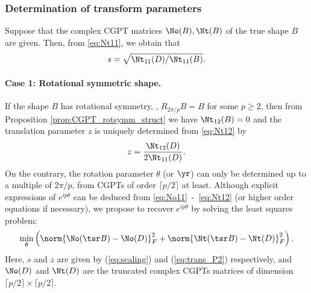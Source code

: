 \subsubsection{Determination of transform
  parameters}\label{sec:determ-transf-param}
Suppose that the complex CGPT matrices $\No(B), \Nt(B)$ of the
true shape $B$ are given. Then, from \eqref{eq:Nt11}, we obtain
that
\begin{align}
  s = \sqrt{\Nt_{11}(D) / \Nt_{11}(B)}. \label{eq:scaling}
\end{align}

\paragraph{Case 1: Rotational symmetric shape.}
If the shape $B$ has rotational symmetry, \ie, $R_{2\pi /p}B =B$
for some $p\geq 2$, then from Proposition
\ref{prop:CGPT_rotsymm_struct} we have $\Nt_{12}(B)=0$ and the
translation parameter $z$ is uniquely determined from
\eqref{eq:Nt12} by
\begin{align}
  z = \frac{\Nt_{12}(D)}{2\Nt_{11}(D)}. \label{eq:trans_P2}
\end{align}
On the contrary, the rotation parameter $\theta$ (or $\yr$) can
only be determined up to a multiple of ${2\pi/p}$, from CGPTs of
order $\lceil p/2 \rceil$ at least. Although explicit expressions
of $e^{ip\theta}$ can be deduced from
\eqref{eq:No11}~-~\eqref{eq:Nt12} (or higher order equations if
necessary), we propose to recover $e^{ip\theta}$ by solving the
least squares problem:
\begin{align}
  \min_\theta \left(\norm{\No(\tsr B) - \No(D)}_F^2 + \norm{\Nt(\tsr
      B) - \Nt(D)}_F^2\right).  \label{eq:rot_lst}
\end{align}
Here, $s$ and $z$ are given by (\ref{eq:scaling}) and
(\ref{eq:trans_P2}) respectively, and $\No(D)$ and $\Nt(D)$ are
the truncated complex CGPTs matrices of dimension $\lceil p/2
\rceil \times \lceil p/2 \rceil$.



